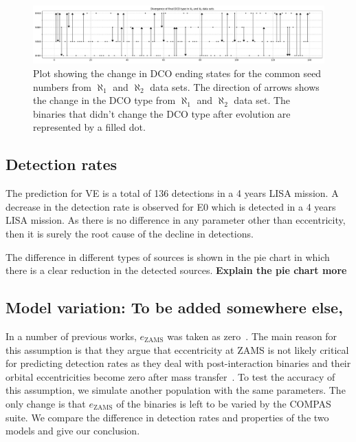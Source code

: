 \documentclass[journal, twocolumn]{IEEEtran}
\begin{document}
    \begin{figure}[!h]%
    	\centering
    	\includegraphics[width=\textwidth]{analysis_data/dcotype_divergence_in_two_datasets}
    	\caption{Plot showing the change in DCO ending states for the common seed numbers from $\aleph_1$ and $\aleph_2$ data sets. The direction of arrows shows the change in the DCO type from $\aleph_1$ and $\aleph_2$ data set. The binaries that didn't change the DCO type after evolution are represented by a filled dot.}
    	\label{fig:dcotypedivergenceintwodatasets}
    \end{figure}%
    
	
    \subsection{Detection rates}\label{subsec:detectionetection-rates}
    The prediction for VE is a total of 136 detections in a 4 years LISA mission.
    A decrease in the detection rate is observed for E0 which is detected in a 4 years LISA mission.
    As there is no difference in any parameter other than eccentricity, then it is surely the root cause of the decline in detections.

    The difference in different types of sources is shown in the pie chart in which there is a clear reduction in the detected sources. \textbf{Explain the pie chart more}


    \subsection{Model variation: To be added somewhere else,}
    \label{subsec:model_variation}
    In a number of previous works, $e_\text{ZAMS}$ was taken as zero~\cite{Vigna2018, Barrett2018, Lau2020, Broekgaarden2021, wagg2021gravitational}.
    The main reason for this assumption is that they argue that eccentricity at ZAMS is not likely critical for predicting detection rates as they deal with post-interaction binaries and their orbital eccentricities become zero after mass transfer~\cite{Hurley2002}. %
    To test the accuracy of this assumption, we simulate another population with the same parameters.
    The only change is that $e_\text{ZAMS}$ of the binaries is left to be varied by the COMPAS suite.
    We compare the difference in detection rates and properties of the two models and give our conclusion.
\end{document}
